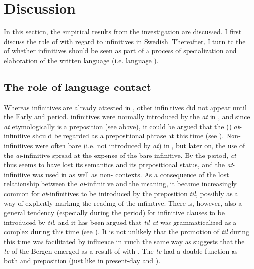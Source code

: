 \documentclass[output=paper]{langscibook}
\begin{document}
\section{Discussion}\label{sec:kalm:5}

In this section, the empirical results from the investigation are discussed. I first discuss the role of  with regard to  infinitives in Swedish. Thereafter, I turn to the  of whether  infinitives should be seen as part of a process of specialization and elaboration of the written language (i.e. language ). 


\subsection{The role of language contact}\label{sec:kalm:5.1}

Whereas  infinitives are already attested in , other  infinitives did not appear until the Early and  period.  infinitives were normally introduced by the  \textit{at} in , and since \textit{at} etymologically is a preposition (see  above), it could be argued that the () \textit{at}{}-infinitive should be regarded as a prepositional phrase at this time (see \citealt{Kalm2016Satsekvivalenta}). Non- infinitives were often bare (i.e. not introduced by \textit{at}) in , but later on, the use of the \textit{at}{}-infinitive spread at the expense of the bare infinitive. By the  period, \textit{at} thus seems to have lost its  semantics and its prepositional status, and the \textit{at}{}-infinitive was used in  as well as non- contexts. As a consequence of the lost relationship between the \textit{at}{}-infinitive and the  meaning, it became increasingly common for  \textit{at}{}-infinitives to be introduced by the preposition \textit{til}, possibly as a way of explicitly marking the  reading of the infinitive. There is, however, also a general tendency (especially during the  period) for infinitive clauses to be introduced by \textit{til}, and it has been argued that \textit{til at} was grammaticalized as a complex  during this time (see \citealt{Kalm2014,Kalm2016Satsekvivalenta}). It is not unlikely that the promotion of \textit{til} during this time was facilitated by  influence in much the same way as \citet{Nesse2002} suggests that the  \textit{te} of the  Bergen  emerged as a result of  with . The  \textit{te} had a double function as both  and preposition (just like in present-day  and ).
\end{document}
